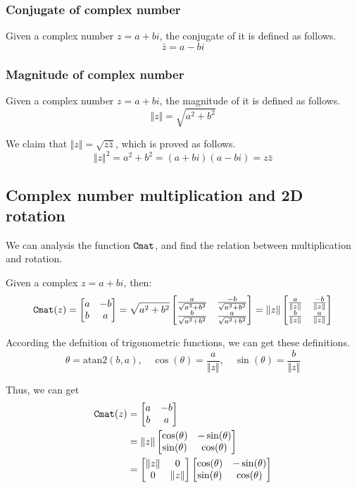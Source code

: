 \documentclass[runningheads,a4paper,english]{llncs}[2022/01/12]
\newcommand{\Clen}[1]{\Vert #1\Vert}
\newcommand{\bmatL}{\begin{bmatrix}}
\newcommand{\bmatR}{\end{bmatrix}}
\begin{document}
\subsubsection{Conjugate of complex number}
Given a complex number $z=a+bi$, the conjugate of it is defined as follows.
\begin{equation}
  \bar{z}=a-bi
\end{equation}

\subsubsection{Magnitude of complex number}
Given a complex number $z=a+bi$, the magnitude of it is defined as follows.
\begin{equation}
  \Clen{z}=\sqrt{a^2+b^2}
\end{equation}

We claim that $\Clen{z}=\sqrt{z\bar{z}}$, which is proved as follows.
\begin{equation}
  \Clen{z}^2=a^2+b^2=(a+bi)(a-bi)=z\bar{z}
\end{equation}
    
\subsection{Complex number multiplication and 2D rotation}

We can analysis the function $\Cmat$, and find the relation between multiplication and rotation.

Given a complex $z=a+bi$, then:
\begin{equation}
  \Cmat{z}=\bmatL a&-b\\b&a\bmatR 
  =\sqrt{a^2+b^2}
  \bmatL \frac{a}{\sqrt{a^2+b^2}}&\frac{-b}{\sqrt{a^2+b^2}}\\
    \frac{b}{\sqrt{a^2+b^2}}&\frac{a}{\sqrt{a^2+b^2}}\bmatR 
  =\Clen{z}
  \bmatL \frac{a}{\Clen{z}}&\frac{-b}{\Clen{z}}\\
    \frac{b}{\Clen{z}}&\frac{a}{\Clen{z}}\bmatR 
\end{equation}

According the defnition of trigonometric functions, we can get these definitions.
\begin{equation}
  \theta=\mathrm{atan2}(b,a),\quad
  \cos(\theta)=\frac{a}{\Clen{z}},\quad
  \sin(\theta)=\frac{b}{\Clen{z}}
\end{equation}

Thus, we can get
\begin{equation}
  \begin{aligned}
    \Cmat{z}&=\bmatL a&-b\\b&a\bmatR \\
            &=\Clen{z}\bmatL \cos(\theta)&-\sin(\theta)\\\sin(\theta)&\cos(\theta)\bmatR \\
            &=\bmatL \Clen{z}&0\\0&\Clen{z}\bmatR 
              \bmatL \cos(\theta)&-\sin(\theta)\\\sin(\theta)&\cos(\theta)\bmatR 
  \end{aligned}
\end{equation}
\end{document}
